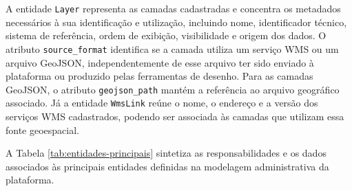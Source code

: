 A entidade \texttt{Layer} representa as camadas cadastradas e concentra os metadados necessários à sua identificação e utilização, incluindo nome, identificador técnico, sistema de referência, ordem de exibição, visibilidade e origem dos dados. O atributo \texttt{source\_format} identifica se a camada utiliza um serviço WMS ou um arquivo GeoJSON, independentemente de esse arquivo ter sido enviado à plataforma ou produzido pelas ferramentas de desenho. Para as camadas GeoJSON, o atributo \texttt{geojson\_path} mantém a referência ao arquivo geográfico associado. Já a entidade \texttt{WmsLink} reúne o nome, o endereço e a versão dos serviços WMS cadastrados, podendo ser associada às camadas que utilizam essa fonte geoespacial.

A Tabela \ref{tab:entidades-principais} sintetiza as responsabilidades e os dados associados às principais entidades definidas na modelagem administrativa da plataforma.

